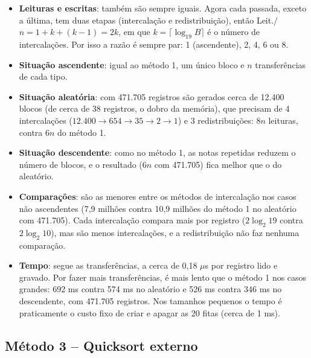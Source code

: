 \documentclass{article}
\begin{document}
\begin{itemize}
    \item \textbf{Leituras e escritas}: também são sempre iguais. Agora cada passada, exceto a última, tem duas etapas (intercalação e redistribuição), então Leit./$n = 1 + k + (k-1) = 2k$, em que $k = \lceil \log_{19} B \rceil$ é o número de intercalações. Por isso a razão é sempre par: 1 (ascendente), 2, 4, 6 ou 8.
    \item \textbf{Situação ascendente}: igual ao método 1, um único bloco e $n$ transferências de cada tipo.
    \item \textbf{Situação aleatória}: com 471.705 registros são gerados cerca de 12.400 blocos (de cerca de 38 registros, o dobro da memória), que precisam de 4 intercalações ($12.400 \to 654 \to 35 \to 2 \to 1$) e 3 redistribuições: $8n$ leituras, contra $6n$ do método 1.
    \item \textbf{Situação descendente}: como no método 1, as notas repetidas reduzem o número de blocos, e o resultado ($6n$ com 471.705) fica melhor que o do aleatório.
    \item \textbf{Comparações}: são as menores entre os métodos de intercalação nos casos não ascendentes (7,9 milhões contra 10,9 milhões do método 1 no aleatório com 471.705). Cada intercalação compara mais por registro ($2\log_2 19$ contra $2\log_2 10$), mas são menos intercalações, e a redistribuição não faz nenhuma comparação.
    \item \textbf{Tempo}: segue as transferências, a cerca de 0,18 $\mu$s por registro lido e gravado. Por fazer mais transferências, é mais lento que o método 1 nos casos grandes: 692 ms contra 574 ms no aleatório e 526 ms contra 346 ms no descendente, com 471.705 registros. Nos tamanhos pequenos o tempo é praticamente o custo fixo de criar e apagar as 20 fitas (cerca de 1 ms).
\end{itemize}

\subsection{Método 3 -- Quicksort externo}
\end{document}
